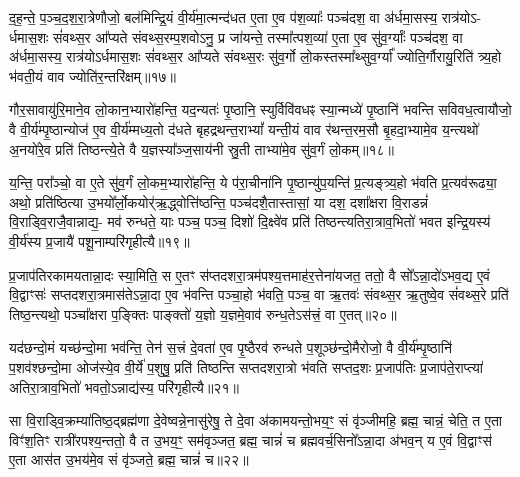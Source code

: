 द॒ह॒न्ते॒ प॒ञ्च॒द॒श॒रा॒त्रेणौजो॒ बल॑मिन्द्रि॒यं वी॒र्य॑मा॒त्मन्द॑धत ए॒ता ए॒व प॑श॒व्याः᳚ पञ्च॑दश॒ वा अ॑र्धमा॒सस्य॒ रात्र॑यो\-ऽ- र्धमास॒शः सं॑वथ्स॒र आ᳚प्यते संवथ्स॒रम्प॒शवो\-ऽनु॒ प्र जा॑यन्ते॒ तस्मा᳚त्पश॒व्या॑ ए॒ता ए॒व सु॑व॒र्ग्याः᳚ पञ्च॑दश॒ वा अ॑र्धमा॒सस्य॒ रात्र॑यो\-ऽर्धमास॒शः सं॑वथ्स॒र आ᳚प्यते संवथ्स॒रः सु॑व॒र्गो लो॒कस्तस्मा᳚थ्सुव॒र्ग्या᳚ ज्योति॒र्गौरायु॒रिति॑ त्र्य॒हो भ॑वती॒यं वाव ज्योति॑र॒न्तरि॑क्षम्॥१७॥

गौर॒सावायु॑रि॒माने॒व लो॒कान॒भ्यारो॑हन्ति॒ यद॒न्यतः॑ पृ॒ष्ठानि॒ स्युर्विवि॑वधꣴ स्या॒न्मध्ये॑ पृ॒ष्ठानि॑ भवन्ति सविवध॒त्वायौजो॒ वै वी॒र्य॑म्पृ॒ष्ठान्योज॑ ए॒व वी॒र्य॑म्मध्य॒तो द॑धते बृहद्रथन्त॒रा\-भ्यां᳚ यन्ती॒यं वाव र॑थन्त॒रम॒सौ बृ॒हदा॒भ्यामे॒व य॒न्त्यथो॑ अ॒नयो॑रे॒व प्रति॑ तिष्ठन्त्ये॒ते वै य॒ज्ञस्या᳚ञ्ज॒साय॑नी स्रु॒ती ताभ्या॑मे॒व सु॑व॒र्गं लो॒कम्॥१८॥

य॒न्ति॒ परा᳚ञ्चो॒ वा ए॒ते सु॑व॒र्गं लो॒कम॒भ्यारो॑हन्ति॒ ये प॑रा॒चीना॑नि पृ॒ष्ठान्यु॑प॒यन्ति॑ प्र॒त्यङ्त्र्य॒हो भ॑वति प्र॒त्यव॑रूढ्या॒ अथो॒ प्रति॑ष्ठित्या उ॒भयो᳚र्लो॒कयोर्॑ऋ॒द्ध्वोत्ति॑ष्ठन्ति॒ पञ्च॑दशै॒तास्तासां॒ या दश॒ दशा᳚क्षरा वि॒राडन्नं॑ वि॒राड्वि॒राजै॒वान्नाद्य॒- मव॑ रुन्धते॒ याः पञ्च॒ पञ्च॒ दिशो॑ दि॒क्ष्वे॑व प्रति॑ तिष्ठन्त्यतिरा॒त्राव॒भितो॑ भवत इन्द्रि॒यस्य॑ वी॒र्य॑स्य प्र॒जायै॑ पशू॒नाम्परि॑गृहीत्यै॥१९॥

{\anuvakamend[{ग॒च्छ॒न्त्य॒ग्नि॒ष्टुता॑ पा॒प्मान॒न्निर॒न्तरि॑क्षल्लोँ॒कं प्र॒जायै॒ द्वे च॑॥७॥}]}

प्र॒जाप॑तिरकामयतान्ना॒दः स्या॒मिति॒ स ए॒तꣳ स॑प्तदशरा॒त्रम॑पश्य॒त्तमाह॑र॒त्तेना॑यजत॒ ततो॒ वै सो᳚\-ऽन्ना॒दो॑\-ऽभव॒द्य ए॒वं वि॒द्वाꣳसः॑ सप्तदशरा॒त्रमास॑ते\-ऽन्ना॒दा ए॒व भ॑वन्ति पञ्चा॒हो भ॑वति॒ पञ्च॒ वा ऋ॒तवः॑ संवथ्स॒र ऋ॒तुष्वे॒व सं॑वथ्स॒रे प्रति॑ तिष्ठ॒न्त्यथो॒ पञ्चा᳚क्षरा प॒ङ्क्तिः पाङ्क्तो॑ य॒ज्ञो य॒ज्ञमे॒वाव॑ रुन्ध॒ते\-ऽस॑त्त्रं॒ वा ए॒तत्॥२०॥

यद॑छन्दो॒मं यच्छ॑न्दो॒मा भव॑न्ति॒ तेन॑ स॒त्त्रं दे॒वता॑ ए॒व पृ॒ष्ठैरव॑ रुन्धते प॒शूञ्छ॑न्दो॒मैरोजो॒ वै वी॒र्य॑म्पृ॒ष्ठानि॑ प॒शव॑श्छन्दो॒मा ओज॑स्ये॒व वी॒र्ये॑ प॒शुषु॒ प्रति॑ तिष्ठन्ति सप्तदशरा॒त्रो भ॑वति सप्तद॒शः प्र॒जाप॑तिः प्र॒जाप॑ते॒राप्त्या॑ अतिरा॒त्राव॒भितो॑ भवतो॒\-ऽन्नाद्य॑स्य॒ परि॑गृहीत्यै॥२१॥

{\anuvakamend[{ए॒तथ्स॒प्तत्रिꣳ॑श्चच्च॥८॥}]}

सा वि॒राड्वि॒क्रम्या॑तिष्ठ॒द्ब्रह्म॑णा दे॒वेष्वन्ने॒नासु॑रेषु॒ ते दे॒वा अ॑कामयन्तो॒भय॒ꣳ॒ सं वृ॑ञ्जीमहि॒ ब्रह्म॒ चान्नं॒ चेति॒ त ए॒ता विꣳ॑श॒तिꣳ रात्री॑रपश्य॒न्ततो॒ वै त उ॒भय॒ꣳ॒ सम॑वृञ्जत॒ ब्रह्म॒ चान्नं॑ च ब्रह्मवर्च॒सिनो᳚\-ऽन्ना॒दा अ॑भव॒न् य ए॒वं वि॒द्वाꣳस॑ ए॒ता आस॑त उ॒भय॑मे॒व सं वृ॑ञ्जते॒ ब्रह्म॒ चान्नं॑ च॥२२॥

